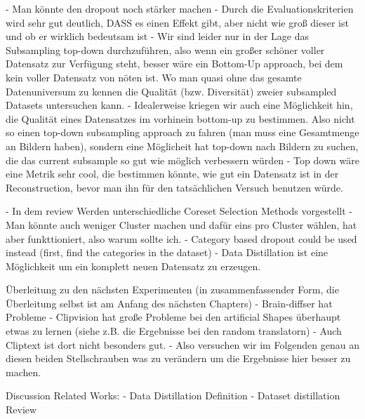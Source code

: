 - Man könnte den dropout noch stärker machen
- Durch die Evaluationskriterien wird sehr gut deutlich, DASS es einen Effekt gibt, aber nicht wie groß dieser ist und ob er wirklich bedeutsam ist
- Wir sind leider nur in der Lage das Subsampling top-down durchzuführen, also wenn ein großer schöner voller Datensatz zur Verfügung steht, besser wäre ein Bottom-Up approach, bei dem kein voller Datensatz von nöten ist. Wo man quasi ohne das gesamte Datenuniversum zu kennen die Qualität (bzw. Diversität) zweier subsampled Datasets untersuchen kann. 
- Idealerweise kriegen wir auch eine Möglichkeit hin, die Qualität eines Datensatzes im vorhinein bottom-up zu bestimmen. Also nicht so einen top-down subsampling approach zu fahren (man muss eine Gesamtmenge an Bildern haben), sondern eine Möglicheit hat top-down nach Bildern zu suchen, die das current subsample so gut wie möglich verbessern würden
  - Top down wäre eine Metrik sehr cool, die bestimmen könnte, wie gut ein Datensatz ist in der Reconstruction, bevor man ihn für den tatsächlichen Versuch benutzen würde.

- In dem review \cite{guoDeepCoreComprehensiveLibrary2022} Werden unterschiedliche Coreset Selection Methods vorgestellt
- Man könnte auch weniger Cluster machen und dafür eins pro Cluster wählen, hat aber funkttioniert, also warum sollte ich.
- Category based dropout could be used instead (first, find the categories in the dataset)
- Data Distillation ist eine Möglichkeit um ein komplett neuen Datensatz zu erzeugen. 

Überleitung zu den nächsten Experimenten (in zusammenfassender Form, die Überleitung selbst ist am Anfang des nächsten Chapters)
- Brain-diffser hat Probleme
  - Clipvision hat große Probleme bei den artificial Shapes überhaupt etwas zu lernen (siehe z.B. die Ergebnisse bei den random translatorn)
  - Auch Cliptext ist dort nicht besonders gut. 
  - Also versuchen wir im Folgenden genau an diesen beiden Stellschrauben was zu verändern um die Ergebnisse hier besser zu machen. 

Discussion Related Works:
  - Data Distillation Definition \cite{wangDatasetDistillation2018}
  - Dataset distillation Review \cite{yuDatasetDistillationComprehensive2024}

